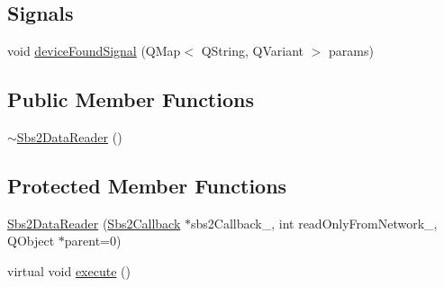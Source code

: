 \subsection*{Signals}
\begin{DoxyCompactItemize}
\item 
void \hyperlink{classSbs2DataReader_af3811e79dd9f544405a5bb83d2c61a9c}{device\-Found\-Signal} (Q\-Map$<$ Q\-String, Q\-Variant $>$ params)
\end{DoxyCompactItemize}
\subsection*{Public Member Functions}
\begin{DoxyCompactItemize}
\item 
\hyperlink{classSbs2DataReader_a722a0ea14fc88b13817701f647c63d7e}{$\sim$\-Sbs2\-Data\-Reader} ()
\end{DoxyCompactItemize}
\subsection*{Protected Member Functions}
\begin{DoxyCompactItemize}
\item 
\hyperlink{classSbs2DataReader_acb12eae29b9e3715e4604a745859c153}{Sbs2\-Data\-Reader} (\hyperlink{classSbs2Callback}{Sbs2\-Callback} $\ast$sbs2\-Callback\-\_\-, int read\-Only\-From\-Network\-\_, Q\-Object $\ast$parent=0)
\item 
virtual void \hyperlink{classSbs2DataReader_a08efa39d3a0b6a4f8f545a3fbd0998a0}{execute} ()
\end{DoxyCompactItemize}
